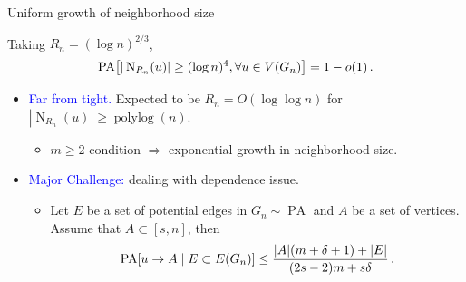 \documentclass{beamer}
\theoremstyle{plain}
\theoremstyle{definition}
\let\originalleft\left
\let\originalright\right
\renewcommand{\left}{\mathopen{}\mathclose\bgroup\originalleft}
\renewcommand{\right}{\aftergroup\egroup\originalright}
\begin{document}
\begin{frame}{Uniform growth of neighborhood size}
\begin{lemma}
    Taking $R_n=(\log n)^{2/3}$, 
    \begin{equation}
        \operatorname{PA}\left[|\operatorname{N}_{R_n}(u)|\geq (\log n)^4,\forall u\in V(G_n)\right]=1-o(1)\,.\notag
    \end{equation}
\end{lemma}
   \begin{itemize}
       \item\pause \textcolor{blue}{Far from tight.} Expected to be $R_n=O(\log\log n)$ for $|\operatorname{N}_{R_n}(u)|\geq \operatorname{polylog}(n)$. 
       \begin{itemize}
           \item\pause $m\geq 2$ condition $\Rightarrow$ exponential growth in neighborhood size.
       \end{itemize}
       \item\pause \textcolor{blue}{Major Challenge:} dealing with dependence issue.
       \begin{itemize}
           \item \begin{lemma}
       Let $E$ be a set of potential edges in $G_n\sim\operatorname{PA}$ and $A$ be a set of vertices. Assume that $A\subset [ s,n]$, then 
    \begin{equation}
    \operatorname{PA}[u\to A\mid E\subset E(G_n)]\le \frac{|A|(m+\delta+1)+|E|}{(2s-2)m+s\delta}\,.\notag
    \end{equation}
   \end{lemma}
       \end{itemize}
   \end{itemize}
\end{frame}
\end{document}
